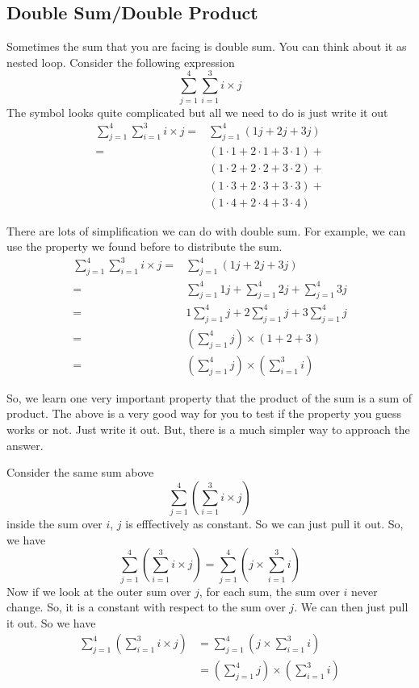 \documentclass[a4paper, 12pt]{article}
\begin{document}
\begin{multicols}{2}
\section*{Double Sum/Double Product}

Sometimes the sum that you are facing is double sum. You can think about it as nested loop. Consider the following expression
\[
\sum_{j=1}^{4} \sum_{i=1}^{3} i \times j
\]
The symbol looks quite complicated but all we need to do is just write it out
\begin{align*}
\sum_{j=1}^{4} \sum_{i=1}^{3} i \times j =& \sum_{j=1}^{4} (1j + 2j + 3j)\\
 =& (1\cdot 1 + 2 \cdot 1  + 3 \cdot 1)+\\ 
 & (1\cdot 2 + 2 \cdot 2  + 3 \cdot 2)+\\
 & (1\cdot 3 + 2 \cdot 3  + 3 \cdot 3)+\\
 & (1\cdot 4 + 2 \cdot 4  + 3 \cdot 4)
\end{align*}

There are lots of simplification we can do with double sum. For example, we can use the property we found before to distribute the sum.
\begin{align*}
\sum_{j=1}^{4} \sum_{i=1}^{3} i \times j =& \sum_{j=1}^{4} (1j + 2j + 3j)\\
=&  \sum_{j=1}^{4} 1j + \sum_{j=1}^{4} 2j + \sum_{j=1}^{4} 3j\\
=& 1\sum_{j=1}^{4} j + 2\sum_{j=1}^{4} j + 3\sum_{j=1}^{4} j\\
=& \left( \sum_{j=1}^{4} j \right) \times (1 + 2 + 3)\\
=& \left( \sum_{j=1}^{4} j \right) \times \left( \sum_{i=1}^{3} i \right)
\end{align*}

So, we learn one very important property that the product of the sum is a sum of product. The above is a very good way for you to test if the property you guess works or not. Just write it out. But, there is a much simpler way to approach the answer.

Consider the same sum above
\[
\sum_{j=1}^{4} \left(\sum_{i=1}^{3} i \times j \right)
\]
inside the sum over $i$, $j$ is efffectively as constant. So we can just pull it out. So, we have
\[
\sum_{j=1}^{4} \left(\sum_{i=1}^{3} i \times j \right) = \sum_{j=1}^{4} \left(j \times \sum_{i=1}^{3} i \right)
\]
Now if we look at the outer sum over $j$, for each sum, the sum over $i$ never change. So, it is a constant with respect to the sum over $j$. We can then just pull it out. So we have
\begin{align*}
\sum_{j=1}^{4} \left(\sum_{i=1}^{3} i \times j \right)& = \sum_{j=1}^{4} \left(j \times \sum_{i=1}^{3} i \right) \\
&= \left( \sum_{j=1}^{4} j \right) \times \left( \sum_{i=1}^{3} i \right)
\end{align*}


\end{multicols}
\end{document}
